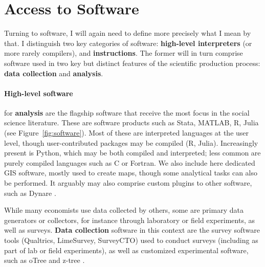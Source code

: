 \documentclass{article}
\begin{document}





\section{Access to Software}
\label{sec:software}

Turning to software, I will again need to define more precisely what I mean by that. I distinguish two key categories of software: \textbf{high-level interpreters} (or more rarely compilers), and \textbf{instructions}. The former will in turn comprise software used in two key but distinct features of the scientific production process: \textbf{data collection} and \textbf{analysis}. 

\paragraph{High-level software} for \textbf{analysis} are the flagship software  that receive the most  focus in the social science literature. These are software products such as Stata, MATLAB, R, Julia (see Figure~\ref{fig:software}). Most of these are interpreted languages at the user level, though user-contributed packages may be compiled (R, Julia). Increasingly present is Python, which may be both compiled and interpreted; less common are purely compiled languages such as C or Fortran. We also include here dedicated \ac{GIS} software, mostly used to create maps, though some analytical tasks can also be performed. It arguably may also comprise custom plugins to other software, such as Dynare \citep{adjemian_dynare_2024,cherrier_write_2023}.



While many economists use data collected by others, some are primary data generators or collectors, for instance through laboratory or field experiments, as well as surveys. \textbf{Data collection} software in this context are the survey software tools (Qualtrics, LimeSurvey, SurveyCTO) used to conduct surveys (including as part of lab or field experiments), as well as customized experimental software, such as oTree \citep{chen_otreeopen-source_2016} and z-tree \citep{fischbacher_z-tree_2021}.
\end{document}
